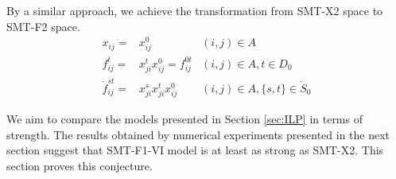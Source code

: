 By a similar approach, we achieve the transformation from SMT-X2 space to SMT-F2 space. 
\begin{subequations}
\begin{align}
\label{eq:tr:xij=xij0}x_{ij}=&x^0_{ij} & (i,j)\in A\\
\label{eq:tr:fijt2}f^t_{ij}=&x^t_{ji}x^0_{ij}=f^{0t}_{ij} & (i,j)\in A, t\in D_0\\
\label{eq:tr:fstij2}\check{f}^{st}_{ij}=& x^s_{ji}x^t_{ji}x^0_{ij} & (i,j)\in A, \{s,t\}\in \check{S}_0
\end{align}
\end{subequations}

We aim to compare the models presented in Section \ref{sec:ILP} in terms of strength.
The results obtained by numerical experiments presented in the next section suggest that SMT-F1-VI model is at least as strong as SMT-X2.
This section proves this conjecture.
 
